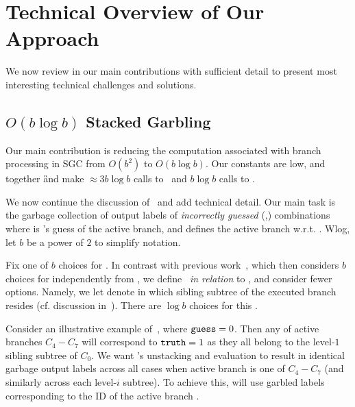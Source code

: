 
\section{Technical Overview of Our Approach}
\label{sec:techOverview}

We  now review in our main contributions with sufficient  detail to present most interesting  technical challenges and  solutions.

\subsection{$O(b\log b)$ Stacked Garbling}
\label{sec:techOverviewSG}

Our main contribution is reducing the computation associated with branch processing in SGC from $O(b^2)$ to $O(b \log b)$.  Our constants are low, and together \G and \E make $\approx 3 b \log b$ calls to \Gb\ and $b\log b$ calls  to \Ev.  

We now continue the discussion of~ and add  technical detail.  
Our main task is the garbage collection of output labels of {\em incorrectly guessed} (\truth,\guess) combinations 
where
\guess is \E's guess of the active branch, and \truth defines the active branch w.r.t. \guess.   Wlog, let $b$ be a power of $2$ to simplify notation.

Fix one of $b$ choices for \guess.  In contrast with previous work~\HK, which then considers $b$ choices for \truth independently from \guess, we define \truth\ {\em in relation} to \guess, and consider fewer \truth options.  Namely,
we  let \truth  denote in which sibling subtree of \guess the executed branch resides (cf. discussion in~).  There are $\log b$ choices for this \truth.

Consider an illustrative example of~, where $\mathtt{guess}=0$.  Then any of active branches $C_4-C_7$ will correspond to $\mathtt{truth} = 1$ as they all belong to the level-$1$ sibling subtree of $C_0$.  We want \E's unstacking and evaluation to result in identical garbage output labels across all cases when active branch is one of $C_4-C_7$  (and similarly across each level-$i$ subtree).  To achieve this, \E will use garbled labels corresponding to the ID of the active branch \aid.



